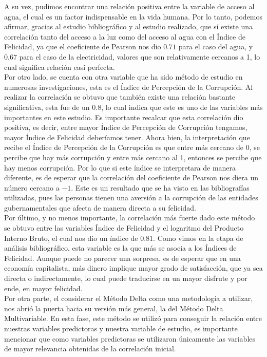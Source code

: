 A su vez, pudimos encontrar una relación positiva entre la variable de acceso al agua, el cual es un factor indispensable en la vida humana. Por lo tanto, podemos afirmar, gracias al estudio bibliográfico y al estudio realizado, que sí existe una correlación tanto del acceso a la luz como del acceso al agua con el Índice de Felicidad, ya que el coeficiente de Pearson nos dio $0.71$ para el caso del agua, y $0.67$ para el caso de la electricidad, valores que son relativamente cercanos a 1, lo cual significa relación casi perfecta.\\

Por otro lado, se cuenta con otra variable que ha sido método de estudio en numerosas investigaciones, esta es el Índice de Percepción de la Corrupción. Al realizar la correlación se obtuvo que también existe una relación bastante significativa, esta fue de un $0.8$, lo cual indica que este es uno de las variables más importantes en este estudio. Es importante recalcar que esta correlación dio positiva, es decir, entre mayor Índice de Percepción de Corrupción tengamos, mayor Índice de Felicidad deberíamos tener. Ahora bien, la interpretación que recibe el Índice de Percepción de la Corrupción es que entre más cercano de 0, se percibe que hay más corrupción y entre más cercano al 1, entonces se percibe que hay menos corrupción. Por lo que si este índice se interpretara de manera diferente, es de esperar que la correlación del coeficiente de Pearson nos diera un número cercano a $-1$. Este es un resultado que se ha visto en las bibliografías utilizadas, pues las personas tienen una aversión a la corrupción de las entidades gubernamentales que afecta de manera directa a su felicidad. \\

Por último, y no menos importante, la correlación más fuerte dado este método se obtuvo entre las variables Índice de Felicidad y el logaritmo del Producto Interno Bruto, el cual nos dio un índice de $0.81$. Como vimos en la etapa de análisis bibliográfico, esta variable es la que más se asocia a los Índices de Felicidad. Aunque puede no parecer una sorpresa, es de esperar que en una economía capitalista, más dinero implique mayor grado de satisfacción, que ya sea directa o indirectamente, lo cual puede traducirse en un mayor disfrute y por ende, en mayor felicidad. \\ 

Por otra parte, el considerar el Método Delta como una metodología a utilizar, nos abrió la puerta hacia su versión más general, la del Método Delta Multivariable. En esta fase, este método se utilizó para conseguir la relación entre nuestras variables predictoras y nuestra variable de estudio, es importante mencionar que como variables predictoras se utilizaron únicamente las variables de mayor relevancia obtenidas de la correlación inicial.

